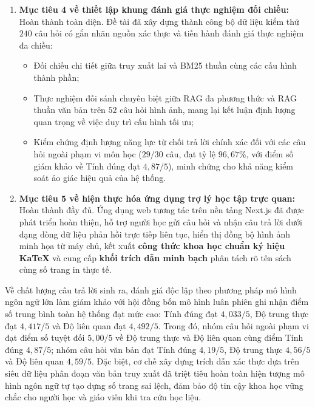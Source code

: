 \begin{enumerate}
    \item \textbf{Mục tiêu 4 về thiết lập khung đánh giá thực nghiệm đối chiếu:} Hoàn thành toàn diện. Đề tài đã xây dựng thành công bộ dữ liệu kiểm thử $240$ câu hỏi có gắn nhãn nguồn xác thực và tiến hành đánh giá thực nghiệm đa chiều:
    \begin{itemize}
        \item Đối chiếu chi tiết giữa truy xuất lai và BM25 thuần cùng các cấu hình thành phần;
        \item Thực nghiệm đối sánh chuyên biệt giữa RAG đa phương thức và RAG thuần văn bản trên $52$ câu hỏi hình ảnh, mang lại kết luận định lượng quan trọng về việc duy trì cấu hình tối ưu;
        \item Kiểm chứng định lượng năng lực từ chối trả lời chính xác đối với các câu hỏi ngoài phạm vi môn học ($29/30$ câu, đạt tỷ lệ $96{,}67\%$, với điểm số giám khảo về Tính đúng đạt $4{,}87/5$), minh chứng cho khả năng kiểm soát ảo giác hiệu quả của hệ thống.
    \end{itemize}

    \item \textbf{Mục tiêu 5 về hiện thực hóa ứng dụng trợ lý học tập trực quan:} Hoàn thành đầy đủ. Ứng dụng web tương tác trên nền tảng Next.js đã được phát triển hoàn thiện, hỗ trợ người học gửi câu hỏi và nhận câu trả lời dưới dạng dòng dữ liệu phản hồi trực tiếp liên tục, hiển thị đồng bộ hình ảnh minh họa từ máy chủ, kết xuất \textbf{công thức khoa học chuẩn ký hiệu KaTeX} và cung cấp \textbf{khối trích dẫn minh bạch} phân tách rõ tên sách cùng số trang in thực tế.
\end{enumerate}

Về chất lượng câu trả lời sinh ra, đánh giá độc lập theo phương pháp mô hình ngôn ngữ lớn làm giám khảo với hội đồng bốn mô hình luân phiên ghi nhận điểm số trung bình toàn hệ thống đạt mức cao: Tính đúng đạt $4{,}033/5$, Độ trung thực đạt $4{,}417/5$ và Độ liên quan đạt $4{,}492/5$. Trong đó, nhóm câu hỏi ngoài phạm vi đạt điểm số tuyệt đối $5{,}00/5$ về Độ trung thực và Độ liên quan cùng điểm Tính đúng $4{,}87/5$; nhóm câu hỏi văn bản đạt Tính đúng $4{,}19/5$, Độ trung thực $4{,}56/5$ và Độ liên quan $4{,}59/5$. Đặc biệt, cơ chế xây dựng trích dẫn xác thực dựa trên siêu dữ liệu phân đoạn văn bản truy xuất đã triệt tiêu hoàn toàn hiện tượng mô hình ngôn ngữ tự tạo dựng số trang sai lệch, đảm bảo độ tin cậy khoa học vững chắc cho người học và giáo viên khi tra cứu học liệu.

